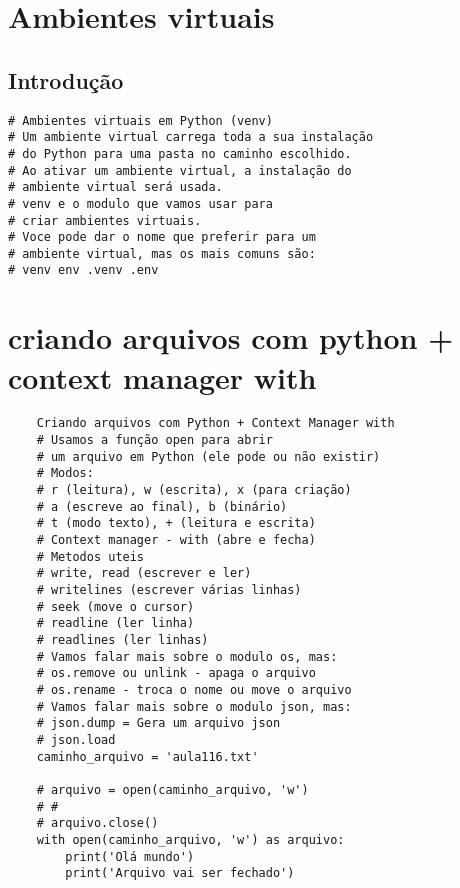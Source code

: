 \documentclass{article}
\begin{document}
\section{Ambientes virtuais}
\subsection{Introdução}
\begin{lstlisting}
# Ambientes virtuais em Python (venv)
# Um ambiente virtual carrega toda a sua instalação
# do Python para uma pasta no caminho escolhido.
# Ao ativar um ambiente virtual, a instalação do
# ambiente virtual será usada.
# venv e o modulo que vamos usar para
# criar ambientes virtuais.
# Voce pode dar o nome que preferir para um
# ambiente virtual, mas os mais comuns são:
# venv env .venv .env
\end{lstlisting}
\section{criando arquivos com python + context manager with}
\begin{lstlisting}
    Criando arquivos com Python + Context Manager with
    # Usamos a função open para abrir
    # um arquivo em Python (ele pode ou não existir)
    # Modos:
    # r (leitura), w (escrita), x (para criação)
    # a (escreve ao final), b (binário)
    # t (modo texto), + (leitura e escrita)
    # Context manager - with (abre e fecha)
    # Metodos uteis
    # write, read (escrever e ler)
    # writelines (escrever várias linhas)
    # seek (move o cursor)
    # readline (ler linha)
    # readlines (ler linhas)
    # Vamos falar mais sobre o modulo os, mas:
    # os.remove ou unlink - apaga o arquivo
    # os.rename - troca o nome ou move o arquivo
    # Vamos falar mais sobre o modulo json, mas:
    # json.dump = Gera um arquivo json
    # json.load
    caminho_arquivo = 'aula116.txt'
    
    # arquivo = open(caminho_arquivo, 'w')
    # #
    # arquivo.close()
    with open(caminho_arquivo, 'w') as arquivo:
        print('Olá mundo')
        print('Arquivo vai ser fechado')
\end{lstlisting}
\end{document}
